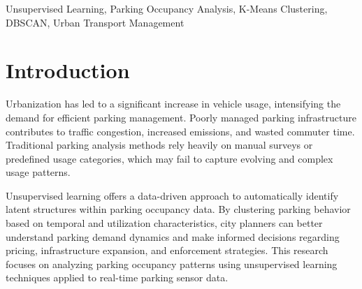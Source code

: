 \documentclass[conference]{IEEEtran}
\begin{document}
\begin{abstract}
Efficient parking management is a critical component of modern urban transport systems, directly influencing traffic congestion, fuel consumption, and commuter experience. With the increasing availability of parking occupancy data from smart sensing systems, unsupervised learning techniques can be leveraged to uncover hidden usage patterns without relying on predefined labels. This study presents an unsupervised machine learning approach for analyzing parking occupancy patterns using real-world time-stamped parking data. Feature engineering techniques were applied to extract temporal and occupancy-based attributes, followed by clustering using K-Means and DBSCAN algorithms. The results demonstrate that K-Means effectively identifies dominant parking usage patterns, while DBSCAN excels in detecting irregular and anomalous parking behaviors. A comparative analysis highlights the strengths and limitations of each approach, providing insights for urban transport planning and smart parking management.
\end{abstract}

\begin{IEEEkeywords}
Unsupervised Learning, Parking Occupancy Analysis, K-Means Clustering, DBSCAN, Urban Transport Management
\end{IEEEkeywords}

\section{Introduction}
Urbanization has led to a significant increase in vehicle usage, intensifying the demand for efficient parking management. Poorly managed parking infrastructure contributes to traffic congestion, increased emissions, and wasted commuter time. Traditional parking analysis methods rely heavily on manual surveys or predefined usage categories, which may fail to capture evolving and complex usage patterns.

Unsupervised learning offers a data-driven approach to automatically identify latent structures within parking occupancy data. By clustering parking behavior based on temporal and utilization characteristics, city planners can better understand parking demand dynamics and make informed decisions regarding pricing, infrastructure expansion, and enforcement strategies. This research focuses on analyzing parking occupancy patterns using unsupervised learning techniques applied to real-time parking sensor data. 
\end{document}
